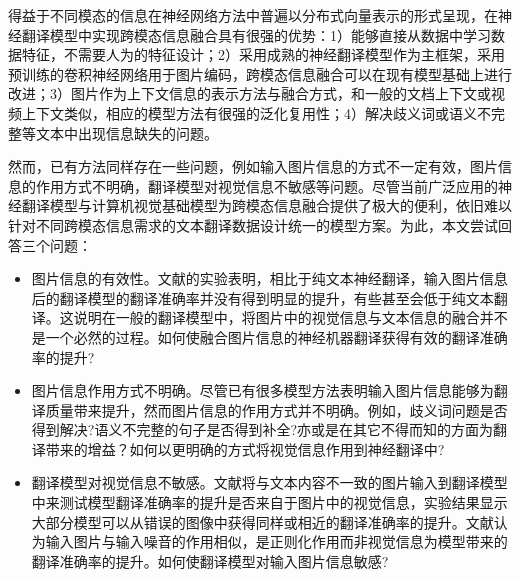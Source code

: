 得益于不同模态的信息在神经网络方法中普遍以分布式向量表示的形式呈现，在神经翻译模型中实现跨模态信息融合具有很强的优势：1）能够直接从数据中学习数据特征，不需要人为的特征设计；2）采用成熟的神经翻译模型作为主框架，采用预训练的卷积神经网络用于图片编码，跨模态信息融合可以在现有模型基础上进行改进；3）图片作为上下文信息的表示方法与融合方式，和一般的文档上下文或视频上下文类似，相应的模型方法有很强的泛化复用性；4）解决歧义词或语义不完整等文本中出现信息缺失的问题。

然而，已有方法同样存在一些问题，例如输入图片信息的方式不一定有效，图片信息的作用方式不明确，翻译模型对视觉信息不敏感等问题。尽管当前广泛应用的神经翻译模型与计算机视觉基础模型为跨模态信息融合提供了极大的便利，依旧难以针对不同跨模态信息需求的文本翻译数据设计统一的模型方案。为此，本文尝试回答三个问题：
\begin{itemize}
    \item {\sffamily 图片信息的有效性}。文献\cite{21_dutta-chowdhury-elliott-2019-understanding,22_li-etal-2021-vision,20_wu-etal-2021-good}的实验表明，相比于纯文本神经翻译，输入图片信息后的翻译模型的翻译准确率并没有得到明显的提升，有些甚至会低于纯文本翻译。这说明在一般的翻译模型中，将图片中的视觉信息与文本信息的融合并不是一个必然的过程。如何使融合图片信息的神经机器翻译获得有效的翻译准确率的提升?
    \item {\sffamily 图片信息作用方式不明确}。尽管已有很多模型方法表明输入图片信息能够为翻译质量带来提升，然而图片信息的作用方式并不明确。例如，歧义词问题是否得到解决?语义不完整的句子是否得到补全?亦或是在其它不得而知的方面为翻译带来的增益？如何以更明确的方式将视觉信息作用到神经翻译中?
    \item {\sffamily 翻译模型对视觉信息不敏感}。文献\cite{23_elliott-2018-adversarial}将与文本内容不一致的图片输入到翻译模型中来测试模型翻译准确率的提升是否来自于图片中的视觉信息，实验结果显示大部分模型可以从错误的图像中获得同样或相近的翻译准确率的提升。文献\cite{20_wu-etal-2021-good}认为输入图片与输入噪音的作用相似，是正则化作用而非视觉信息为模型带来的翻译准确率的提升。如何使翻译模型对输入图片信息敏感?
\end{itemize}

